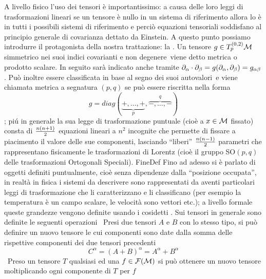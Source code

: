A livello fisico l'uso dei tensori \`e importantissimo: a causa delle loro leggi di trasformazioni lineari se un tensore \`e nullo in un sistema di riferimento allora lo \`e in tutti i possibili sistemi di riferimento e perci\`o equazioni tensoriali soddisfano al principio generale di covarianza dettato da Einstein. A questo punto possiamo introdurre il protagonista della nostra trattazione: la .
Un tensore $g\in T_p^{(0,2)}{\cal M}$ simmetrico nei suoi indici covarianti e non degenere\ viene detto metrica o prodotto scalare. In seguito sar\`a indicato anche tramite $\partial_{\alpha}\cdot\partial_{\beta}=g(\partial_{\alpha},\partial_{\beta})=g_{\alpha\beta}$.\smallskip
Pu\`o inoltre essere classificata in base al segno dei suoi autovalori\ e viene chiamata metrica a segnatura $(p,q)$ se pu\`o essere riscritta nella forma $$g=diag(\underbrace{+,\dots,+}_p,\overbrace{-,\dots,-}^q)$$; pi\'u in generale la sua legge di trasformazione puntuale (cio\`e a $x\in {\cal M}$ fissato) consta di ${n(n+1)\over 2}$ equazioni lineari a $n^2$ incognite che permette di fissare a piacimento il valore delle sue componenti,  lasciando ``liberi'' ${n(n-1)\over 2}$ parametri che rappresentano fisicamente le trasformazioni di Lorentz (cio\`e il gruppo {\Gruppi SO$(p,q)$} delle trasformazioni Ortogonali Speciali).
FineDef
Fino ad adesso si \`e parlato di oggetti definiti puntualmente, cio\`e senza dipendenze dalla ``posizione occupata'', in realt\`a in fisica i sistemi da descrivere sono rappresentati da  aventi particolari leggi di trasformazione che li caratterizzano e li classifi\-ca\-no (per esempio la temperatura \`e un campo scalare, le velocit\`a sono vettori etc.); a livello formale queste grandezze vengono definite usando i cosidetti . Sui tensori in generale sono definite le seguenti operazioni
\smallskip
{}\ Presi due tensori $A$ e $B$ con lo stesso tipo, si pu\`o definire un nuovo tensore le cui componenti sono date dalla somma delle rispettive componenti dei due tensori precedenti
$$
C^\alpha=(A+B)^\alpha=A^\alpha+B^\alpha
$$
\ Preso un tensore $T$ qualsiasi ed una $f\in {\cal F}({\cal M})$ si pu\`o ottenere un nuovo tensore moltiplicando ogni componente di $T$ per $f$
